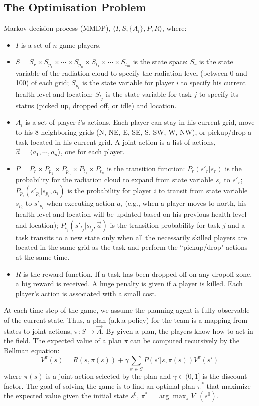 \subsection{The Optimisation Problem}
 Markov decision process (MMDP),
$\langle I, S, \{A_i\}, P, R \rangle$, where:
\begin{itemize}
  \item $I$ is a set of $n$ game players. 
  \item $S = S_r \times S_{p_1} \times \cdots \times S_{p_n}
      \times S_{t_1} \times \cdots \times S_{t_m}$ is the state
      space: $S_r$ is the state variable of the radiation cloud
      to specify the radiation level (between 0 and 100) of
      each grid; $S_{p_i}$ is the state variable for player $i$
      to specify his current health level and location;
      $S_{t_j}$ is the state variable for task $j$ to specify
      its status (picked up, dropped off, or idle) and
      location.
  \item $A_i$ is a set of player $i$'s actions. Each player can
      stay in his current grid, move to his 8 neighboring grids
      (N, NE, E, SE, S, SW, W, NW), or pickup/drop a task
      located in his current grid. A joint action is a list of
      actions, $\vec{a}=\langle a_1, \cdots, a_n \rangle$, one
      for each player.
  \item $P = P_r \times P_{p_1} \times P_{p_n} \times P_{t_1}
      \times P_{t_n}$ is the transition function:
      $P_r(s'_r|s_r)$ is the probability for the radiation
      cloud to expand from state variable $s_r$ to $s'_r$;
      $P_{p_i}(s'_{p_i}|s_{p_i}, a_i)$ is the probability for
      player $i$ to transit from state variable $s_{p_i}$ to
      $s'_{p_i}$ when executing action $a_i$ (e.g., when a
      player moves to north, his health level and location will
      be updated based on his previous health level and
      location); $P_{t_j}(s'_{t_j}|s_{t_j}, \vec{a})$ is the
      transition probability for task $j$ and a task transits
      to a new state only when all the necessarily skilled
      players are located in the same grid as the task and
      perform the ``pickup/drop" actions at the same time.
  \item $R$ is the reward function. If a task has been dropped
      off on any dropoff zone, a big reward is received. A huge
      penalty is given if a player is killed. Each player's
      action is associated with a small cost.
\end{itemize}
At each time step of the game, we assume the planning agent is
fully observable of the current state. Thus, a plan (a.k.a policy)
for the team is a mapping from states to joint actions, $\pi: S
\rightarrow \vec{A}$. By given a plan, the players know how to act
in the field. The expected value of a plan $\pi$ can be computed
recursively by the Bellman equation:
\begin{equation}
  V^\pi(s) = R(s, \pi(s)) + \gamma \sum_{s'\in S} P(s'|s, \pi(s)) V^\pi(s')
\end{equation}
where $\pi(s)$ is a joint action selected by the plan and $\gamma
\in (0, 1]$ is the discount factor. The goal of solving the game is
to find an optimal plan $\pi^*$ that maximize the expected value
given the initial state $s^0$, $\pi^* = \arg\max_{\pi} V^\pi(s^0)$.
